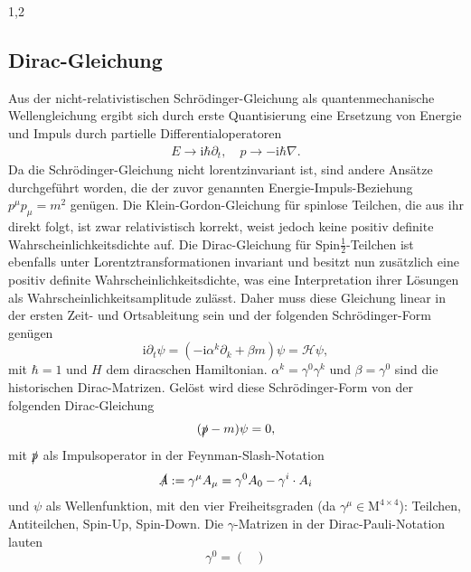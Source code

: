 \documentclass[11pt,a4paper,twoside]{report}
\begin{document}
\begin{spacing}{1,2}
\subsection{Dirac-Gleichung}
\vspace{-0.5cm}
Aus der nicht-relativistischen Schrödinger-Gleichung als quantenmechanische Wellengleichung ergibt sich durch erste Quantisierung \cite{TeilFortgeschr} eine Ersetzung von Energie 
und Impuls durch partielle Differentialoperatoren
\begin{align*}
 E \rightarrow \text{i}\hbar\partial_t, \quad p \rightarrow -\text{i}\hbar\nabla.
\end{align*}
Da die Schrödinger-Gleichung nicht lorentzinvariant ist, sind andere Ansätze durchgeführt worden, die der zuvor genannten Energie-Impuls-Beziehung $p^\mu p_\mu = m^2$
genügen. Die Klein-Gordon-Gleichung für spinlose Teilchen, die aus ihr direkt folgt, ist zwar relativistisch korrekt, weist jedoch keine positiv definite 
Wahrscheinlichkeitsdichte auf. Die Dirac-Gleichung für Spin$\frac12$-Teilchen ist ebenfalls unter Lorentztransformationen invariant und besitzt nun
zusätzlich eine positiv definite Wahrscheinlichkeitsdichte, was eine Interpretation ihrer Lösungen als Wahrscheinlichkeitsamplitude zulässt. Daher muss diese
Gleichung linear in der ersten Zeit- und Ortsableitung sein und der folgenden Schrödinger-Form genügen \cite{RelQuantMech}
\begin{equation}
 \text{i} \partial_t \psi = \left(-\text{i}\alpha^k\partial_k + \beta m\right)\psi = \mathcal{H} \psi,
 \label{eq_diracSchroedinger}
\end{equation}
mit $\hbar = 1$ und $H$ dem diracschen Hamiltonian. $\alpha^k = \gamma^0\gamma^k$ und $\beta = \gamma^0$ sind die historischen Dirac-Matrizen. Gelöst wird
diese Schrödinger-Form von der folgenden Dirac-Gleichung
\begin{equation}
 (\slashed{p} - m )\psi = 0,
 \label{eq_dirac}
\end{equation}
mit $\slashed{p}$ als Impulsoperator in der Feynman-Slash-Notation
\begin{equation}
 \slashed{A} := \gamma^\mu A_\mu = \gamma^0 A_0 - \gamma^i\cdot A_i
\end{equation}
und $\psi$ als Wellenfunktion, mit den vier Freiheitsgraden (da $\gamma^\mu \in \text{M}^{4\times4}$): Teilchen, Antiteilchen, Spin-Up, Spin-Down.
Die $\gamma$-Matrizen in der Dirac-Pauli-Notation lauten
\begin{equation*}
  \gamma^0 = \begin{pmatrix} 

\end{pmatrix}
\end{equation*}
\end{spacing}
\end{document}
